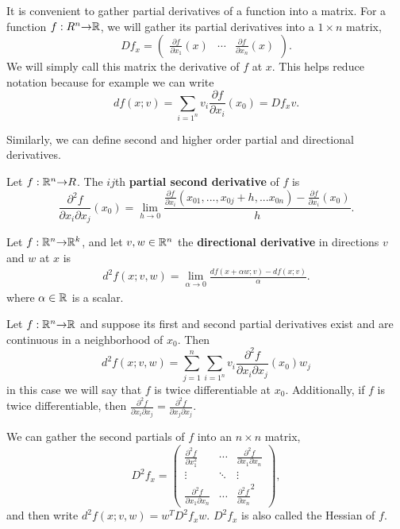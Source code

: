 It is convenient to gather partial derivatives of a function into a
matrix. For a function $f: R^n {\rightarrow} \mathbb{R}$, we will gather its partial
derivatives into a $1 \times n$ matrix, 
\[ Df_x = \begin{pmatrix} \frac{\partial f}{\partial x_1}(x) & \cdots
  & \frac{\partial f}{\partial x_n}(x)
\end{pmatrix}. \]
We will simply call this matrix the derivative of $f$ at $x$. This
helps reduce notation because for example we can write
\[ df(x;v) = \sum_{i=1^n} v_i \frac{\partial f}{\partial x_i}
(x_0) = Df_x v. \]

Similarly, we can define second and higher order partial and
directional derivatives.
\begin{definition}
  Let $f:\mathbb{R}^n {\rightarrow} R$. The $ij$th \textbf{partial second derivative} of $f$
  is 
  \[ \frac{\partial^2 f}{\partial x_i \partial x_j} (x_0) = \lim_{h \to 0}
  \frac{\frac{\partial f}{\partial x_i} (x_{01},...,x_{0j}+h, ... x_{0n}) -
    \frac{\partial f}{\partial x_i}(x_0) }{h}. \] 
\end{definition}
\begin{definition}
  Let $f: \mathbb{R}^n {\rightarrow} \mathbb{R}^k$, and let $v, w \in \mathbb{R}^n$ the \textbf{directional
    derivative} in directions $v$ and $w$ at $x$ is
  \begin{align*}
    d^2f(x;v,w) = \lim_{\alpha \to 0} \frac{df(x + \alpha w;v) - df(x;v)}{\alpha}.
  \end{align*}  
  where $\alpha \in \mathbb{R}$ is a scalar.
\end{definition}
\begin{theorem}\label{thm:pddiff2}
  Let $f:\mathbb{R}^n {\rightarrow} \mathbb{R}$ and suppose its first and second partial
  derivatives exist and are continuous in a neighborhood of
  $x_0$. Then
  \[ d^2f(x;v,w) = \sum_{j=1}^n \sum_{i=1^n} v_i \frac{\partial^2
    f}{\partial x_i \partial x_j}
  (x_0) w_j \]
  in this case we will say that $f$ is twice differentiable at $x_0$. 
  Additionally, if $f$ is twice differentiable, then $\frac{\partial^2
    f}{\partial x_i \partial x_j} = \frac{\partial^2
    f}{\partial x_j \partial x_j}$.
\end{theorem}
We can gather the second partials of $f$ into an $n \times n$ matrix,
\[ D^2 f_{x} = \begin{pmatrix} \frac{\partial ^2 f}{\partial x_1^2}
  & \cdots & \frac{\partial^2 f }{\partial x_1\partial x_n} \\
  \vdots & \ddots & \vdots \\
  \frac{\partial^2 f}{\partial x_1\partial x_n} & \cdots &
  \frac{\partial^2 f}{\partial x_n}^2 \end{pmatrix},
\]
and then write $d^2f(x;v,w) = w^T D^2 f_x w$. $D^2 f_x$ is also called
the Hessian of $f$.

\clearpage




